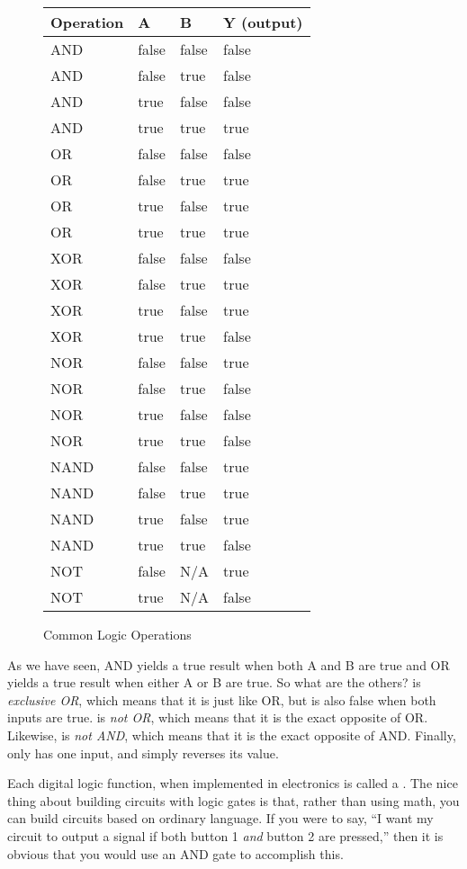 \begin{figure}
\caption{Common Logic Operations}
\centering
\label{figTruthTable}
\begin{tabular}{l | l | l| | l}
\textbf{Operation} & \textbf{A} & \textbf{B} & \textbf{Y} (output) \\
\hline
AND & false & false & false \\
AND & false & true & false \\
AND & true & false & false \\
AND & true & true & true \\
\hline
OR & false & false & false \\
OR & false & true & true \\
OR & true & false & true \\
OR & true & true & true \\
\hline
XOR & false & false & false \\
XOR & false & true & true \\
XOR & true & false & true \\
XOR & true & true & false \\
\hline
NOR & false & false & true \\
NOR & false & true & false \\
NOR & true & false & false \\
NOR & true & true & false \\
\hline
NAND & false & false & true \\
NAND & false & true & true \\
NAND & true & false & true \\
NAND & true & true & false \\
\hline
NOT & false & N/A & true \\
NOT & true & N/A & false \\
\end{tabular}
\end{figure}

As we have seen, AND yields a true result when both A and B are true and OR yields a true result when either A or B are true.
So what are the others?
 is \emph{exclusive OR}, which means that it is just like OR, but is also false when both inputs are true.
 is \emph{not OR}, which means that it is the exact opposite of OR.
Likewise,  is \emph{not AND}, which means that it is the exact opposite of AND.
Finally,  only has one input, and simply reverses its value.

Each digital logic function, when implemented in electronics is called a .
The nice thing about building circuits with logic gates is that, rather than using math, you can build circuits based on ordinary language.
If you were to say, ``I want my circuit to output a signal if both button 1 \emph{and} button 2 are pressed,'' then it is obvious that you would use an AND gate to accomplish this.

